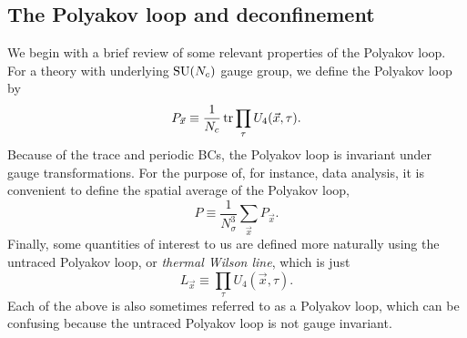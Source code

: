 \subsection{The Polyakov loop and deconfinement}
We begin with a brief review of some relevant properties of the
Polyakov loop. For a theory with underlying $\operatorname{SU}(N_c)$ gauge group, we define
the Polyakov loop by
\begin{equation}\label{eq:ploop}
  P_{\vec{x}}\equiv\frac{1}{N_c}\tr\prod_\tau U_4(\vec{x},\tau).
\end{equation}
Because of the trace and periodic BCs, the Polyakov loop is invariant under
gauge transformations. For the purpose of, for instance, data analysis, it
is convenient to define the spatial average of the Polyakov loop,
\begin{equation}\label{eq:ploopav}
  P\equiv\frac{1}{N_\sigma^3}\sum_{\vec{x}}P_{\vec{x}}.
\end{equation}
Finally, some quantities of interest to us are defined more
naturally using the untraced Polyakov loop, or {\it thermal Wilson line}, 
 which is just
\begin{equation}\label{eq:untracedPolyakov}
  L_{\vec{x}}\equiv\prod_\tau U_4(\vec{x},\tau).
\end{equation}
Each of the above is also sometimes referred to as a Polyakov
loop, which can be confusing because the untraced Polyakov loop is not
gauge invariant.

